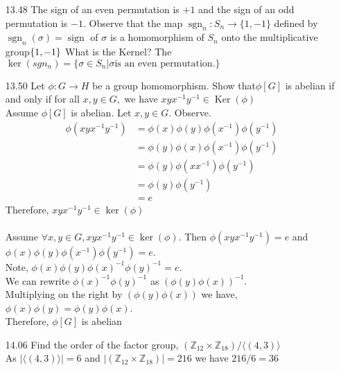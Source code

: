 \documentclass[12pt]{article}
\newcommand{\Z}{\mathds{Z}}
\begin{document}
\begin{enumerate}
	\item[13.48]The sign of an even permutation is $ + 1 $ and the sign of an odd permutation is $ - 1 . $ Observe that the map $ \operatorname { sgn } _ { n } : S _ { n } \rightarrow \{ 1 , - 1 \} $ defined by $ \operatorname { sgn } _ { n } ( \sigma ) = \operatorname { sign } $ of $ \sigma $ is a homomorphism of $ S _ { n } $ onto the multiplicative group$ \{ 1 , - 1 \}\\ $ What is the Kernel?
		The $ \ker(sgn_n)= \{\sigma\in S_n | \sigma \textrm{is an even permutation.}\} $
	\item[13.50]Let $ \phi : G \rightarrow H $ be a group homomorphism. Show that$ \phi [ G ] $ is abelian if and only if for all $ x , y \in G , $ we have $ x y x ^ { - 1 } y ^ { - 1 } \in \operatorname { Ker } ( \phi ) $\\
	Assume $ \phi[G] $ is abelian. Let $x,y \in G$. Observe.
	\begin{align*}
		\phi(xyx^{-1}y^{-1}) &= \phi(x)\phi(y)\phi(x^{-1})\phi(y^{-1})\\
							 &= \phi(y)\phi(x)\phi(x^{-1})\phi(y^{-1})\\
							 &= \phi(y)\phi(xx^{-1})\phi(y^{-1})\\
							 &= \phi(y)\phi(y^{-1})\\
							 &= e
	\end{align*}
	Therefore, $ xyx^{-1}y^{-1}\in\ker(\phi) $\\
	\\
	Assume $ \forall x,y\in G, xyx^{-1}y^{-1}\in\ker(\phi) $. Then $ \phi( xyx^{-1}y^{-1})=e $ and $ \phi(x)\phi(y)\phi(x^{-1})\phi(y^{-1}) = e $.\\ Note, $ \phi(x)\phi(y)\phi(x)^{-1}\phi(y)^{-1}=e$.\\ We can rewrite $ \phi(x)^{-1}\phi(y)^{-1} $ as $ (\phi(y)\phi(x))^{-1} $.\\ Multiplying on the right by $ (\phi(y)\phi(x)) $ we have, $ \phi(x)\phi(y)=\phi(y)\phi(x) $.\\
	Therefore, $ \phi[G] $ is abelian
	\item[14.06] Find the order of the factor group, $( \Z_{ 12 } \times \Z_{ 18 })/\langle ( 4,3 ) \rangle $\\
	As $ |\langle ( 4,3 ) \rangle| = 6 $ and $ |( \Z_{ 12 } \times \Z_{ 18 })|=216 $ we have $ 216/6 = 36 $
	

\end{enumerate}
\end{document}
